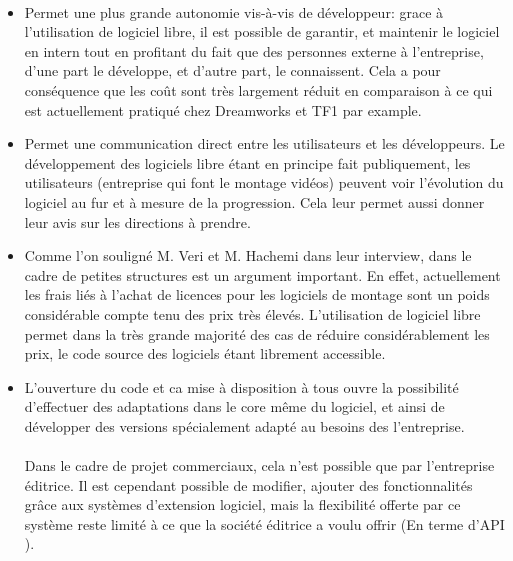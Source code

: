   \paragraph{ }
  \begin{itemize}
    \item{
      Permet une plus grande autonomie vis-à-vis de développeur:
      grace à l'utilisation de logiciel libre,
      il est possible de garantir, et maintenir le logiciel en intern tout
      en profitant du fait que des personnes externe à l'entreprise,
      d'une part le développe, et d'autre part, le connaissent. Cela
      a pour conséquence que les coût sont très largement réduit en
      comparaison à ce qui est actuellement pratiqué chez Dreamworks
      et TF1 par  example.}
    \item{Permet une communication direct entre les utilisateurs et les développeurs. Le développement des logiciels
      libre étant en principe fait publiquement, les utilisateurs (entreprise qui font le montage vidéos) peuvent
      voir l'évolution du logiciel au fur et à mesure de la progression. Cela leur permet aussi donner leur avis
      sur les directions à prendre.}
    \item{Comme l'on souligné  M. Veri et M. Hachemi dans leur interview, dans le cadre de petites
      structures est un argument important.  En effet,  actuellement les frais liés à l'achat de licences
      pour les logiciels de montage sont un poids considérable compte tenu des prix très élevés. L'utilisation
      de logiciel libre permet dans la très grande majorité des cas de réduire considérablement les prix,
      le code source des logiciels étant librement accessible.}
    \item{L'ouverture du code et ca mise à disposition à tous ouvre la possibilité d'effectuer
      des adaptations dans le core même du logiciel, et ainsi de développer des versions
      spécialement adapté au besoins des l'entreprise.
      \paragraph {}
      Dans le cadre de projet commerciaux, cela n'est possible que par l'entreprise éditrice. Il est cependant
      possible de modifier, ajouter des fonctionnalités grâce aux systèmes d'extension logiciel, mais la flexibilité
      offerte par ce système reste limité à ce que la société éditrice a voulu offrir (En terme d'API ).}
  \end {itemize}
